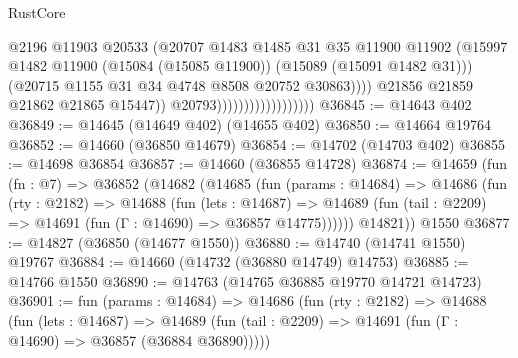 \begin{lexlean}{RustCore}
\begin{coremodule}
                                                @2196
                                                @11903
                                                @20533
                                                (@20707
                                                  @1483
                                                  @1485
                                                  @31
                                                  @35
                                                  @11900
                                                  @11902
                                                  (@15997
                                                    @1482
                                                    @11900
                                                    (@15084 (@15085 @11900))
                                                    (@15089 (@15091 @1482 @31)))
                                                  (@20715
                                                    @1155
                                                    @31
                                                    @34
                                                    @4748
                                                    @8508
                                                    @20752
                                                    @30863))))
                                            @21856
                                            @21859
                                            @21862
                                            @21865
                                            @15447))
                                        @20793))))))))))))))))))
@36845 := @14643 @402
@36849 := @14645 (@14649 @402) (@14655 @402)
@36850 := @14664 @19764
@36852 := @14660 (@36850 @14679)
@36854 := @14702 (@14703 @402)
@36855 := @14698 @36854
@36857 := @14660 (@36855 @14728)
@36874 := @14659
    (fun (fn : @7) =>
    @36852
      (@14682
        (@14685
          (fun (params : @14684) =>
          @14686
            (fun (rty : @2182) =>
            @14688
              (fun (lets : @14687) =>
              @14689 (fun (tail : @2209) => @14691 (fun (Γ : @14690) => @36857 @14775))))))
        @14821))
    @1550
@36877 := @14827 (@36850 (@14677 @1550))
@36880 := @14740 (@14741 @1550) @19767
@36884 := @14660 (@14732 (@36880 @14749) @14753)
@36885 := @14766 @1550
@36890 := @14763 (@14765 @36885 @19770 @14721 @14723)
@36901 := fun (params : @14684) =>
  @14686
    (fun (rty : @2182) =>
    @14688
      (fun (lets : @14687) =>
      @14689 (fun (tail : @2209) => @14691 (fun (Γ : @14690) => @36857 (@36884 @36890)))))

\end{coremodule}
\end{lexlean}
